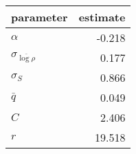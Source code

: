 
\begin{tabular}{lr}
\toprule
parameter & estimate\\
\midrule
$\alpha$ & -0.218\\
$\sigma_{\overline{\log \rho}}$ & 0.177\\
$\sigma_{S}$ & 0.866\\
$\bar{q}$ & 0.049\\
$C$ & 2.406\\
\addlinespace
$r$ & 19.518\\
\bottomrule
\end{tabular}